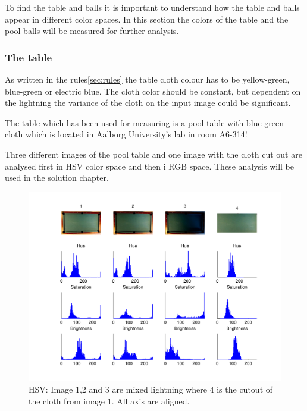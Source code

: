 To find the table and balls it is important to understand how the table and balls appear in different color spaces. In this section the colors of the table and the pool balls will be measured for further analysis.\\

\subsubsection{The table}
As written in the rules\ref{sec:rules} the table cloth colour has to be yellow-green, blue-green or electric blue. The cloth color should be constant, but dependent on the lightning the variance of the cloth on the input image could be significant.

The table which has been used for measuring is a pool table with blue-green cloth which is located in Aalborg University's lab in room A6-314!

Three different images of the pool table and one image with the cloth cut out are analysed first in HSV color space and then i RGB space. These analysis will be used in the solution chapter.

\begin{figure}[H]
\begin{center}
\leavevmode
\includegraphics[width=1\textwidth]{images/hsv_hist_table}
\end{center}
\caption{HSV: Image 1,2 and 3 are mixed lightning where 4 is the cutout of the cloth from image 1. All axis are aligned.}
\label{fig:tablehsv}
\end{figure}

